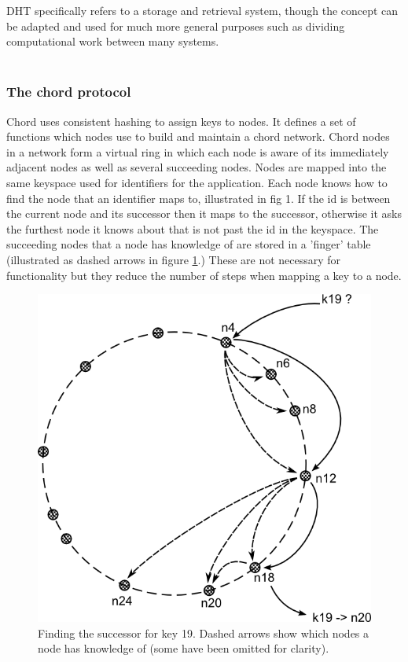 \documentclass{article}
\begin{document}
DHT specifically refers to a storage and retrieval system, though the concept can be adapted and used for much more general purposes such as dividing computational work between many systems.
\\
\\
\subsubsection{The chord protocol} 
Chord \cite{chord} uses consistent hashing to assign keys to nodes. It defines a set of functions which nodes use to build and maintain a chord network. Chord nodes in a network form a virtual ring in which each node is aware of its immediately adjacent nodes as well as several succeeding nodes.
Nodes are mapped into the same keyspace used for identifiers for the application.
Each node knows how to find the node that an identifier maps to, illustrated in fig 1. If the id is between the current node and its successor then it maps to the successor, otherwise it asks the furthest node it knows about that is not past the id in the keyspace. The succeeding nodes that a node has knowledge of are stored in a 'finger' table (illustrated as dashed arrows in figure \ref{fig:chord_succ}.) These are not necessary for functionality but they reduce the number of steps when mapping a key to a node.

\begin{figure}
\centering
\includegraphics{chord_find-successor.png}
\caption[caption]{Finding the successor for key 19. Dashed arrows show which nodes a node has knowledge of (some have been omitted for clarity).}
\label{fig:chord_succ}
\end{figure}
\end{document}
